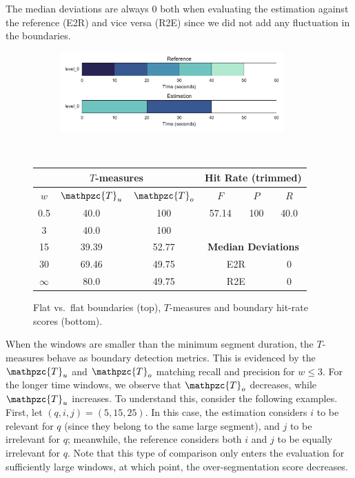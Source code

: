 \documentclass{article}
\def\shag{\ensuremath{\mathpzc{T}}}
\begin{document}
The median deviations are always 0 both when evaluating the estimation against the reference (E2R) and vice
versa (R2E) since we did not add any fluctuation in the boundaries.

\begin{figure}
  \centering
  \begin{subfigure}{0.5\textwidth}
    \centering
    \includegraphics[width=0.94\textwidth]{figs/flat-flat.pdf}
  \end{subfigure}%
  \\
  \begin{minipage}{0.5\textwidth}
    \centering
    \vspace{10pt}
    \begin{tabular}{|c|c|c||c|c|c|}
      \hline
      \multicolumn{3}{|c||}{\textbf{$T$-measures}} & \multicolumn{3}{c|}{\textbf{Hit Rate (trimmed)}} \\
      \hline
      $w$ & $\shag_u$   & $\shag_o$ & $F$     & $P$     & $R$ \\
      \hline
      0.5       & 40.0   & 100   & 57.14  & 100 & 40.0 \\
      \cline{4-6}
      3         & 40.0   & 100  \\
      \cline{4-6}
      15        & 39.39  & 52.77 & \multicolumn{3}{c|}{\textbf{Median Deviations}}   \\
      \cline{4-6}
      30        & 69.46  & 49.75 & \multicolumn{2}{c|}{E2R} & 0 \\
      $\infty$  & 80.0   & 49.75 & \multicolumn{2}{c|}{R2E} & 0 \\  
      \hline
    \end{tabular}
  \end{minipage}
  \caption{Flat vs.\ flat boundaries (top), $T$-measures and boundary hit-rate
  scores (bottom).}
  \label{fig:flat-flat}
\end{figure}

When the windows are smaller than the minimum segment duration, the $T$-measures behave as boundary detection metrics.
This is evidenced by the $\shag_u$ and $\shag_o$ matching recall and precision for $w \leq 3$.
For the longer time windows, we observe that $\shag_o$ decreases, while $\shag_u$ increases.
To understand this, consider the following examples.
First, let $(q,i,j) = (5,15,25)$.
In this case, the estimation considers $i$ to be relevant for $q$ (since they belong to the same large segment), and $j$ to be irrelevant for $q$; meanwhile, the reference considers both $i$ and $j$ to be equally irrelevant for $q$.
Note that this type of comparison only enters the evaluation for sufficiently large windows, at which point, the over-segmentation score decreases.  
\end{document}
